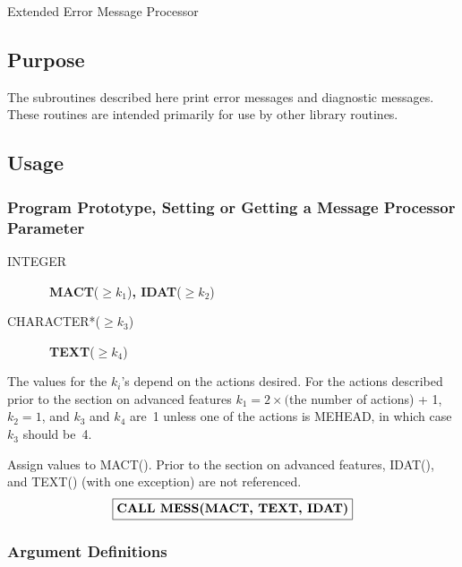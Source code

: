 \documentclass[twoside]{MATH77}
\begin{document}
 Extended Error Message Processor


\subsection{Purpose}

The subroutines described here print error messages and diagnostic messages.
These routines are intended primarily for use by other library routines.

\subsection{Usage}

\subsubsection{Program Prototype, Setting or Getting a Message Processor
Parameter}

\begin{description}
\item[INTEGER]  \ {\bf MACT}($\geq k_1$){\bf , IDAT}($\geq k_2$)

\item[CHARACTER*($\geq k_3$)]  \ {\bf TEXT}($\geq k_4$)
\end{description}

The values for the $k_i$'s depend on the actions desired.  For the
actions described prior to the section on advanced features $k_1 = 2
\times ($the number of actions) + 1, $k_2=1$, and $k_3$ and $k_4$ are~1
unless one of the actions is MEHEAD, in which case $k_3$ should be~4.

Assign values to MACT(). Prior to the section on advanced features,
IDAT(), and TEXT() (with one exception) are not referenced.
$$
\fbox{{\bf CALL MESS(MACT, TEXT, IDAT)}}
$$

\subsubsection{Argument Definitions}
\end{document}
